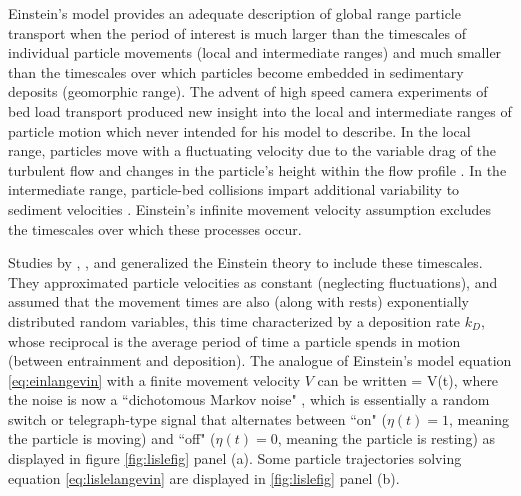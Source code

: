 Einstein's model provides an adequate description of global range particle transport when the period of interest is much larger than the timescales of individual particle movements (local and intermediate ranges) and much smaller than the timescales over which particles become embedded in sedimentary deposits (geomorphic range).
The advent of high speed camera experiments of bed load transport produced new insight into the local and intermediate ranges of particle motion \citep{Abbott1977,Francis1973,Drake1988} which \citet{Einstein1937} never intended for his model to describe.
In the local range, particles move with a fluctuating velocity due to the variable drag of the turbulent flow \citep{Lajeunesse2010,Fathel2015} and changes in the particle's height within the flow profile \citep{VanRijn1984,Wiberg1985}. In the intermediate range, particle-bed collisions impart additional variability to sediment velocities \citep{Gordon1972,Martin2013}.
Einstein's infinite movement velocity assumption excludes the timescales over which these processes occur.

Studies by \citet{Gordon1972}, \citet{Lisle1998}, and \citet{Lajeunesse2017} generalized the Einstein theory to include these timescales. They approximated particle velocities as constant (neglecting fluctuations), and assumed that the movement times are also (along with rests) exponentially distributed random variables, this time characterized by a deposition rate $k_D$, whose reciprocal is the average period of time a particle spends in motion (between entrainment and deposition).
The analogue of Einstein's model equation \ref{eq:einlangevin} with a finite movement velocity $V$ can be written
\be {} = V\eta(t), \ee
where the noise is now a ``dichotomous Markov noise" \citep{Bena2006}, which is essentially a random switch or telegraph-type signal that alternates between ``on" ($\eta(t) = 1$, meaning the particle is moving) and ``off" ($\eta(t) = 0$, meaning the particle is resting) \citep{Cox1965,Horsthemke1984, Masoliver1991, Masoliver1996} as displayed in figure \ref{fig:lislefig} panel (a). Some particle trajectories solving equation \ref{eq:lislelangevin} are displayed in \ref{fig:lislefig} panel (b).

